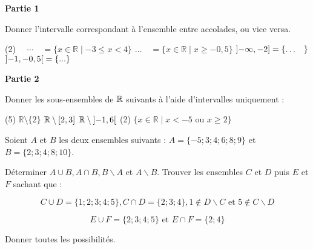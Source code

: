 \documentclass[a4paper,12pt]{report}
\begin{document}
\vspace*{-2\baselineskip}

\begin{acti}
	\phantom{.}
	
	{\bfseries Partie 1}

Donner l'intervalle correspondant à l'ensemble entre accolades, ou vice versa.
\begin{tasks}(2)
\task $\quad \cdots \quad=\{x \in \mathbb{R} \mid-3 \leq x<4\}$
\task $\ldots \quad=\{x \in \mathbb{R} \mid x \geq-0,5\}$
\task $\interval[open left]{-\infty}{-2}=\{\ldots \quad\}$
\task $\interval[open]{-1}{-0,5}=\{... \}$
\end{tasks}

{\bfseries Partie 2}

Donner les sous-ensembles de $\mathbb R$ suivants à l'aide d'intervalles uniquement :
\begin{tasks}(5)
\task $\mathbb{R} \setminus\{2\}$
\task $\mathbb{R} \setminus\interval{2}{3}$
\task $\mathbb{R} \setminus\interval[open]{-1}{6}$
\task*(2) $\{x \in \mathbb{R} \mid x<-5$ ou $x \geq 2\}$
\end{tasks}
\end{acti}

\begin{acti}\phantom{}
	\begin{tasks}
\task Soient $A$ et $B$ les deux ensembles suivants : $A=\{-5 ; 3 ; 4 ; 6 ; 8 ; 9\}$ et $B=\{2 ; 3 ; 4 ; 8 ; 10\}$.

Déterminer $A \cup B, A \cap B, B \backslash A$ et $A \backslash B$.
\task Trouver les ensembles $C$ et $D$ puis $E$ et $F$ sachant que :

\[C \cup D=\{1 ; 2 ; 3 ; 4 ; 5\}, C \cap D=\{2 ; 3 ; 4\}, 1 \notin D \backslash C \text{ et } 5 \notin C \backslash D\]

\[E \cup F=\{2 ; 3 ; 4 ; 5\} \text{ et } E \cap F=\{2 ; 4\}\] 

 Donner toutes les possibilités.
	\end{tasks}
\end{acti}

\end{document}

